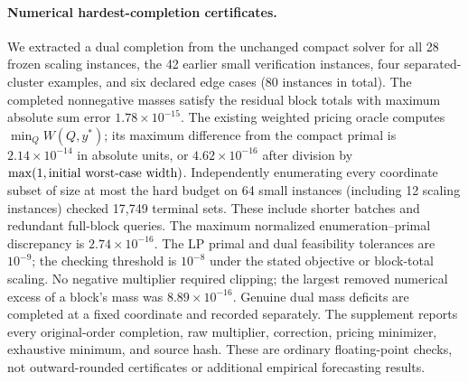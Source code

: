 \paragraph{Numerical hardest-completion certificates.}
We extracted a dual completion from the unchanged compact solver for all
28 frozen scaling instances, the 42 earlier small verification instances,
four separated-cluster examples, and six declared edge cases (80 instances
in total). The completed nonnegative masses satisfy the residual block
totals with maximum absolute sum error $1.78\times10^{-15}$. The existing
weighted pricing oracle computes $\min_Q W(Q,y^*)$; its maximum difference
from the compact primal is $2.14\times10^{-14}$ in absolute units, or
$4.62\times10^{-16}$ after division by
$\max(1,\hbox{initial worst-case width})$. Independently enumerating every
coordinate subset of size at most the hard budget on 64 small instances
(including 12 scaling instances) checked 17,749 terminal sets. These
include shorter batches and redundant full-block queries. The maximum
normalized enumeration--primal discrepancy is $2.74\times10^{-16}$.
The LP primal and dual feasibility tolerances are $10^{-9}$; the checking
threshold is $10^{-8}$ under the stated objective or block-total scaling.
No negative multiplier required clipping; the largest removed numerical
excess of a block's mass was $8.89\times10^{-16}$. Genuine dual mass
deficits are completed at a fixed coordinate and recorded separately.
The supplement reports every original-order completion, raw multiplier,
correction, pricing minimizer, exhaustive minimum, and source hash.
These are ordinary floating-point checks, not outward-rounded
certificates or additional empirical forecasting results.
